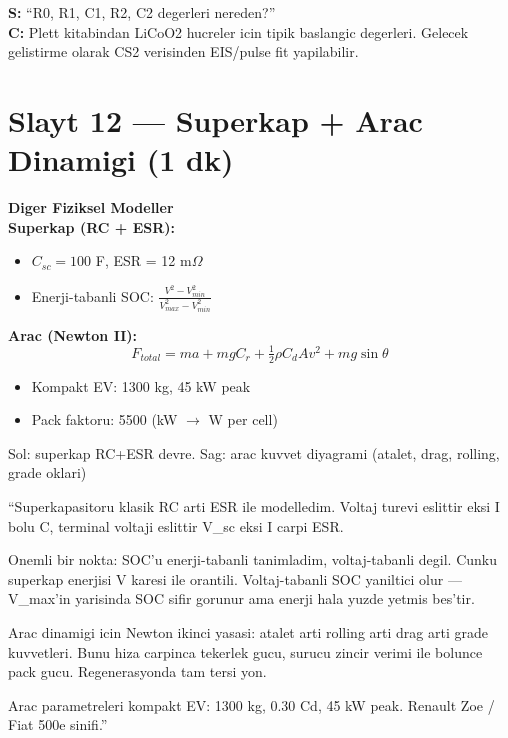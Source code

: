 \documentclass[11pt,a4paper]{article}
\begin{document}
\begin{soruboks}
\textbf{S:} ``R0, R1, C1, R2, C2 degerleri nereden?''\\
\textbf{C:} Plett kitabindan LiCoO2 hucreler icin tipik baslangic degerleri. Gelecek gelistirme olarak CS2 verisinden EIS/pulse fit yapilabilir.
\end{soruboks}

\section{Slayt 12 --- Superkap + Arac Dinamigi (1 dk)}

\begin{slytboks}
\textbf{Diger Fiziksel Modeller}\\[0.3em]
\textbf{Superkap (RC + ESR):}
\begin{itemize}
\item $C_{sc} = 100$ F, ESR = 12 m$\Omega$
\item Enerji-tabanli SOC: $\frac{V^2 - V_{min}^2}{V_{max}^2 - V_{min}^2}$
\end{itemize}
\textbf{Arac (Newton II):}
\[ F_{total} = ma + mgC_r + \tfrac{1}{2}\rho C_d A v^2 + mg\sin\theta \]
\begin{itemize}
\item Kompakt EV: 1300 kg, 45 kW peak
\item Pack faktoru: 5500 (kW $\to$ W per cell)
\end{itemize}
\end{slytboks}

\begin{gorselboks}
Sol: superkap RC+ESR devre. Sag: arac kuvvet diyagrami (atalet, drag, rolling, grade oklari)
\end{gorselboks}

\begin{sayboks}
``Superkapasitoru klasik RC arti ESR ile modelledim. Voltaj turevi eslittir eksi I bolu C, terminal voltaji eslittir V\_sc eksi I carpi ESR.

Onemli bir nokta: SOC'u enerji-tabanli tanimladim, voltaj-tabanli degil. Cunku superkap enerjisi V karesi ile orantili. Voltaj-tabanli SOC yaniltici olur --- V\_max'in yarisinda SOC sifir gorunur ama enerji hala yuzde yetmis bes'tir.

Arac dinamigi icin Newton ikinci yasasi: atalet arti rolling arti drag arti grade kuvvetleri. Bunu hiza carpinca tekerlek gucu, surucu zincir verimi ile bolunce pack gucu. Regenerasyonda tam tersi yon.

Arac parametreleri kompakt EV: 1300 kg, 0.30 Cd, 45 kW peak. Renault Zoe / Fiat 500e sinifi.''
\end{sayboks}
\end{document}
